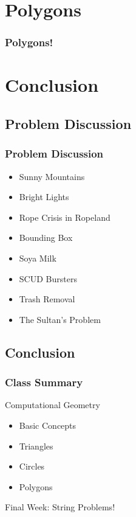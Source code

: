 \documentclass{beamer}
\begin{document}
\section{Polygons}
\begin{frame}
  \frametitle{Polygons!}
\end{frame}








\section{Conclusion}

\subsection{Problem Discussion}
\begin{frame}
  \frametitle{Problem Discussion}
  \begin{itemize}
  \item Sunny Mountains
  \item Bright Lights
  \item Rope Crisis in Ropeland
  \item Bounding Box
  \item Soya Milk
  \item SCUD Bursters
  \item Trash Removal
  \item The Sultan's Problem
  \end{itemize}
\end{frame}

\subsection{Conclusion}
\begin{frame}
  \frametitle{Class Summary}
  Computational Geometry
  \begin{itemize}
  \item Basic Concepts
  \item Triangles
  \item Circles
  \item Polygons
  \end{itemize}

  \begin{block}{}
    Final Week: String Problems!
  \end{block}
\end{frame}
\end{document}
